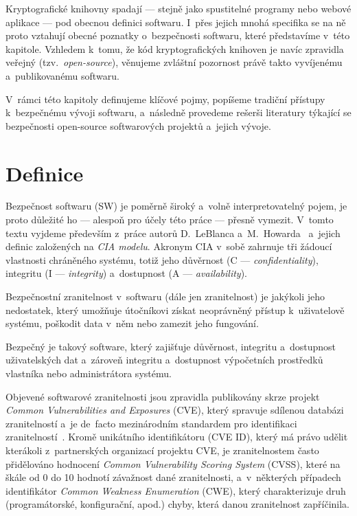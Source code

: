 \label{software}

Kryptografické knihovny spadají --- stejně jako spustitelné programy nebo webové aplikace --- pod obecnou definici softwaru. I~přes jejich mnohá specifika se na ně proto vztahují obecné poznatky o~bezpečnosti softwaru, které představíme v~této kapitole. Vzhledem k~tomu, že kód kryptografických knihoven je navíc zpravidla veřejný (tzv.~\textit{open-source}), věnujeme zvláštní pozornost právě takto vyvíjenému a~publikovanému softwaru.

V~rámci této kapitoly definujeme klíčové pojmy, popíšeme tradiční přístupy k~bez\-peč\-né\-mu vývoji softwaru, a~následně provedeme rešerši literatury týkající se bezpečnosti open-source softwarových projektů a~jejich vývoje.

\section{Definice}

Bezpečnost softwaru (SW) je poměrně široký a~volně interpretovatelný pojem, je proto důležité ho --- alespoň pro účely této práce --- přesně vymezit. V~tomto textu vyjdeme především z~práce autorů D.~LeBlanca a~M.~Howarda~\cite{leblanc2002writing} a~jejich definic založených na \emph{CIA modelu}. Akronym CIA v~sobě zahrnuje tři žádoucí vlastnosti chráněného systému, totiž jeho důvěrnost (C --- \textit{confidentiality}), integritu (I --- \textit{integrity}) a~dostupnost (A --- \textit{availability}).

\begin{definition}
    Bezpečnostní zranitelnost v~softwaru (dále jen zranitelnost) je jakýkoli jeho nedostatek, který umožňuje útočníkovi získat neoprávněný přístup k~uživatelově systému, poškodit data v~něm nebo zamezit jeho fungování. \cite{leblanc2002writing}
\end{definition}

\begin{definition}
    Bezpečný je takový software, který zajišťuje důvěrnost, integritu a~dostupnost uživatelských dat a~zároveň integritu a~dostupnost výpočetních prostředků vlastníka nebo administrátora systému. \cite{leblanc2002writing}
\end{definition}

Objevené softwarové zranitelnosti jsou zpravidla publikovány skrze projekt \textit{Common Vulnerabilities and Exposures} (CVE), který spravuje sdílenou databázi zranitelností a~je de~facto mezinárodním standardem pro identifikaci zranitelností~\cite{cve-overview}. Kromě unikátního identifikátoru (CVE ID), který má právo udělit kterákoli z~partnerských organizací projektu CVE, je zranitelnostem často přidělováno hodnocení \textit{Common Vulnerability Scoring System} (CVSS), které na škále od 0 do 10 hodnotí závažnost dané zranitelnosti, a~v~některých případech identifikátor \textit{Common Weakness Enumeration} (CWE), který charakterizuje druh (programátorské, konfigurační, apod.) chyby, která danou zranitelnost zapříčinila.

